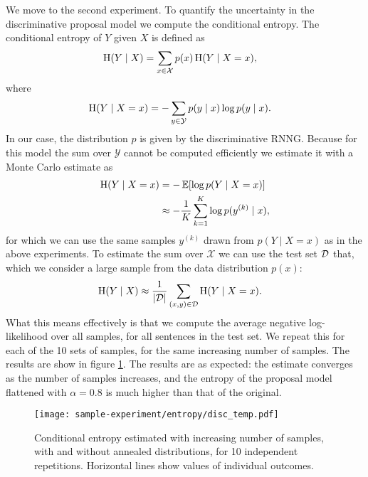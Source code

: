     We move to the second experiment. To quantify the uncertainty in the discriminative proposal model we compute the conditional entropy. The conditional entropy of $Y$ given $X$ is defined as
    \begin{align*}
      \operatorname{H}(Y \mid X) &= \sum_{x \in \mathcal{X}} p(x) \operatorname{H}(Y \mid X = x),
    \end{align*}
    where
    \begin{align*}
      \operatorname{H}(Y \mid X = x)
        &= - \sum_{y \in \mathcal{Y}} p(y \mid x) \log p(y \mid x).
    \end{align*}
    In our case, the distribution $p$ is given by the discriminative RNNG. Because for this model the sum over $\mathcal{Y}$ cannot be computed efficiently we estimate it with a Monte Carlo estimate as
    \begin{align*}
      \operatorname{H}(Y \mid X = x)
        &= - \operatorname{\mathbb{E}} [ \log p(Y \mid X = x)]  \\
        &\approx - \frac{1}{K} \sum_{k=1}^K \log p(y^{(k)} \mid x),
    \end{align*}
    for which we can use the same samples $y^{(k)}$ drawn from $p(Y \mid X = x)$ as in the above experiments. To estimate the sum over $\mathcal{X}$ we can use the test set $\mathcal{D}$ that, which we consider a large sample from the data distribution $p(x)$:
    \begin{align*}
      \operatorname{H}(Y \mid X)
        &\approx \frac{1}{\lvert \mathcal{D} \rvert} \sum_{ (x, y) \in \mathcal{D} } \operatorname{H}(Y \mid X = x).
    \end{align*}
    What this means effectively is that we compute the average negative log-likelihood over all samples, for all sentences in the test set. We repeat this for each of the 10 sets of samples, for the same increasing number of samples. The results are show in figure \ref{fig:samples-entropy}. The results are as expected: the estimate converges as the number of samples increases, and the entropy of the proposal model flattened with $\alpha = 0.8$ is much higher than that of the original.

    \begin{figure}[ht]
      \center
    	\texttt{[image: sample-experiment/entropy/disc\_temp.pdf]}
    \caption{Conditional entropy estimated with increasing number of samples, with and without annealed distributions, for 10 independent repetitions. Horizontal lines show values of individual outcomes.}
    \label{fig:samples-entropy}
    \end{figure}


